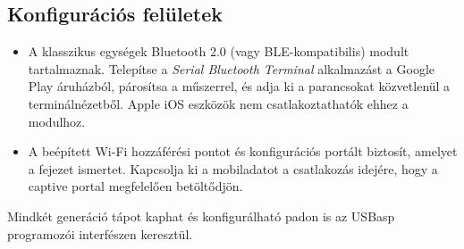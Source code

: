 \subsection{Konfigurációs felületek}
\begin{itemize}
    \item A klasszikus \ReplicaGenOne{} egységek Bluetooth 2.0 (vagy BLE-kompatibilis) modult tartalmaznak. Telepítse a \emph{Serial Bluetooth Terminal} alkalmazást a Google Play áruházból, párosítsa a műszerrel, és adja ki a parancsokat közvetlenül a terminálnézetből. Apple iOS eszközök nem csatlakoztathatók ehhez a modulhoz.
    \item A \ReplicaNextShort{} beépített Wi-Fi hozzáférési pontot és konfigurációs portált biztosít, amelyet a  fejezet ismertet. Kapcsolja ki a mobiladatot a csatlakozás idejére, hogy a captive portal megfelelően betöltődjön.
\end{itemize}
Mindkét generáció tápot kaphat és konfigurálható padon is az USBasp programozói interfészen keresztül.
